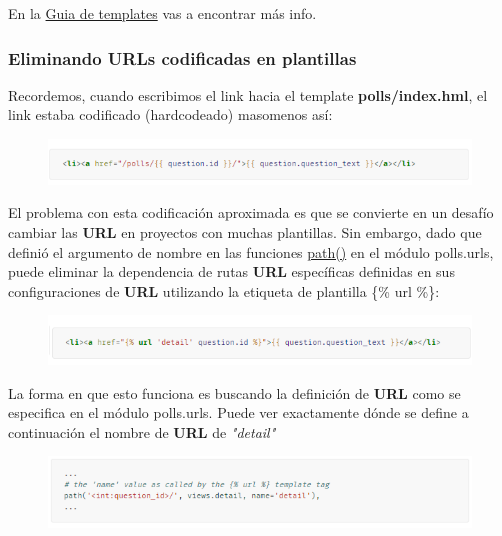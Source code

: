 \documentclass[10pt]{article}
\begin{document}
En la {\href{https://docs.djangoproject.com/en/3.0/topics/templates/}{\textcolor{B}{Guia de templates}}} vas a encontrar más info.


\subsubsection{Eliminando URLs codificadas en plantillas}

Recordemos, cuando escribimos el link hacia el template \textbf{polls/index.hml}, el link estaba codificado (hardcodeado) masomenos así:

\begin{figure}[H]
\begin{center}
\includegraphics[scale=1]{figuras/3/33/336/img1.png}
\end{center}
\end{figure}

El problema con esta codificación aproximada es que se convierte en un desafío cambiar las \textbf{URL} en proyectos con muchas plantillas. Sin embargo, dado que definió el argumento de nombre en las funciones {\href{https://docs.djangoproject.com/en/3.0/ref/urls/\#django.urls.path}{\textcolor{B}{path()}}}
 en el módulo \textcolor{G}{polls.urls}, puede eliminar la dependencia de rutas \textbf{URL} específicas definidas en sus configuraciones de \textbf{URL} utilizando la etiqueta de plantilla \{\% url \%\}:

\begin{figure}[H]
\begin{center}
\includegraphics[scale=1]{figuras/3/33/336/img2.png}
\end{center}
\end{figure}


La forma en que esto funciona es buscando la definición de \textbf{URL} como se especifica en el módulo \textcolor{G}{polls.urls}. Puede ver exactamente dónde se define a continuación el nombre de \textbf{URL} de \textit{"detail"}

\begin{figure}[H]
\begin{center}
\includegraphics[scale=1]{figuras/3/33/336/img3.png}
\end{center}
\end{figure}
\end{document}
